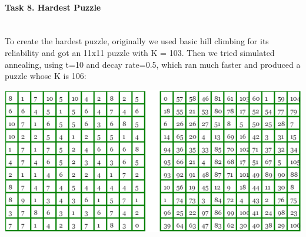 \documentclass[12pt, letterpaper]{article}
\begin{document}
\pagebreak
\paragraph{Task 8. Hardest Puzzle} \mbox{}\\

To create the hardest puzzle, originally we used basic hill climbing for its reliability and got an 11x11 puzzle with K = 103. Then we tried simulated annealing, using t=10 and decay rate=0.5, which ran much faster and produced a puzzle whose K is 106:

\includegraphics[width=\linewidth]{"Task 8/Hardest Puzzle"}
\end{document}
